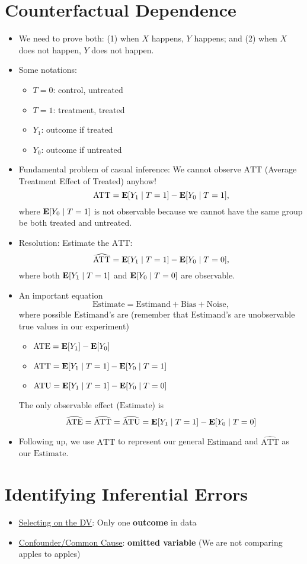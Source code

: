 \documentclass[10pt, letterpaper]{article}
\def\E{\vb E}
\def\ATT{\mathrm{ATT}}
\def\ATE{\mathrm{ATE}}
\def\ATU{\mathrm{ATU}}
\begin{document}
\section{Counterfactual Dependence}
\begin{itemize}
	\item We need to prove both: (1) when $X$ happens, $Y$ happens; and (2) when $X$ does not happen, $Y$ does not happen. 
	\item Some notations:
	\begin{itemize}
		\item $T=0$: control, untreated
		\item $T=1$: treatment, treated
		\item $Y_1$: outcome if treated
		\item $Y_0$: outcome if untreated
	\end{itemize}
	\item Fundamental problem of casual inference: We cannot observe $\ATT$ (Average Treatment Effect of Treated) anyhow!  \[\ATT=\E\qty[Y_1\mid T=1]-\E\qty[Y_0\mid T=1],\] where $\E\qty[Y_0\mid T=1]$ is not observable because we cannot have the same group be both treated and untreated.  
	\item Resolution: Estimate the $\ATT$: \[\widehat{\ATT}=\E\qty[Y_1\mid T=1]-\E\qty[Y_0\mid T=0],\] where both $\E\qty[Y_1\mid T=1]$ and $\E\qty[Y_0\mid T=0]$ are observable.
	\item An important equation \[\boxed{\textrm{Estimate}}=\boxed{\textrm{Estimand}}+\textrm{Bias}+\textrm{Noise},\] where possible $\mathrm{Estimand}$'s are (remember that $\mathrm{Estimand}$'s are unobservable true values in our experiment)
	\begin{itemize}
		\item $\ATE=\E[Y_1]-\E[Y_0]$
		\item $\ATT=\E\qty[Y_1\mid T=1]-\E\qty[Y_0\mid T=1]$
		\item $\ATU=\E\qty[Y_1\mid T=1]-\E\qty[Y_0\mid T=0]$
	\end{itemize}
	The only observable effect ($\mathrm{Estimate}$) is \[\widehat{\ATE}=\widehat{\ATT}=\widehat{\ATU}=\E\qty[Y_1\mid T=1]-\E\qty[Y_0\mid T=0]\]
	\item Following up, we use $\ATT$ to represent our general $\mathrm{Estimand}$ and $\widehat{\ATT}$ as our $\mathrm{Estimate}$.
\end{itemize}

\section{Identifying Inferential Errors}
\begin{itemize}
	\item \underline{Selecting on the DV}: Only one \textbf{outcome} in data
	\item \underline{Confounder/Common Cause}: \textbf{omitted variable} (We are not comparing apples to apples)
\end{itemize}
\end{document}
